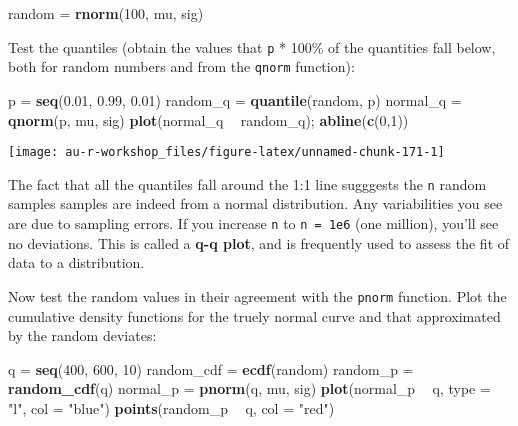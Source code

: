 \documentclass[]{book}
\newenvironment{Shaded}{\begin{snugshade}}{\end{snugshade}}
\newcommand{\KeywordTok}[1]{\textcolor[rgb]{0.13,0.29,0.53}{\textbf{#1}}}
\newcommand{\DataTypeTok}[1]{\textcolor[rgb]{0.13,0.29,0.53}{#1}}
\newcommand{\DecValTok}[1]{\textcolor[rgb]{0.00,0.00,0.81}{#1}}
\newcommand{\FloatTok}[1]{\textcolor[rgb]{0.00,0.00,0.81}{#1}}
\newcommand{\StringTok}[1]{\textcolor[rgb]{0.31,0.60,0.02}{#1}}
\newcommand{\OperatorTok}[1]{\textcolor[rgb]{0.81,0.36,0.00}{\textbf{#1}}}
\newcommand{\NormalTok}[1]{#1}
\theoremstyle{definition}
\theoremstyle{definition}
\theoremstyle{definition}
\theoremstyle{remark}
\begin{document}
\begin{Shaded}
\begin{Highlighting}[]
\NormalTok{random =}\StringTok{ }\KeywordTok{rnorm}\NormalTok{(}\DecValTok{100}\NormalTok{, mu, sig)}
\end{Highlighting}
\end{Shaded}

Test the quantiles (obtain the values that \texttt{p} * 100\% of the
quantities fall below, both for random numbers and from the
\texttt{qnorm} function):

\begin{Shaded}
\begin{Highlighting}[]
\NormalTok{p =}\StringTok{ }\KeywordTok{seq}\NormalTok{(}\FloatTok{0.01}\NormalTok{, }\FloatTok{0.99}\NormalTok{, }\FloatTok{0.01}\NormalTok{)}
\NormalTok{random_q =}\StringTok{ }\KeywordTok{quantile}\NormalTok{(random, p)}
\NormalTok{normal_q =}\StringTok{ }\KeywordTok{qnorm}\NormalTok{(p, mu, sig)}
\KeywordTok{plot}\NormalTok{(normal_q }\OperatorTok{~}\StringTok{ }\NormalTok{random_q); }\KeywordTok{abline}\NormalTok{(}\KeywordTok{c}\NormalTok{(}\DecValTok{0}\NormalTok{,}\DecValTok{1}\NormalTok{))}
\end{Highlighting}
\end{Shaded}

\begin{center}\texttt{[image: au-r-workshop\_files/figure-latex/unnamed-chunk-171-1]} \end{center}

The fact that all the quantiles fall around the 1:1 line sugggests the
\texttt{n} random samples samples are indeed from a normal distribution.
Any variabilities you see are due to sampling errors. If you increase
\texttt{n} to \texttt{n\ =\ 1e6} (one million), you'll see no
deviations. This is called a \textbf{q-q plot}, and is frequently used
to assess the fit of data to a distribution.

Now test the random values in their agreement with the \texttt{pnorm}
function. Plot the cumulative density functions for the truely normal
curve and that approximated by the random deviates:

\begin{Shaded}
\begin{Highlighting}[]
\NormalTok{q =}\StringTok{ }\KeywordTok{seq}\NormalTok{(}\DecValTok{400}\NormalTok{, }\DecValTok{600}\NormalTok{, }\DecValTok{10}\NormalTok{)}
\NormalTok{random_cdf =}\StringTok{ }\KeywordTok{ecdf}\NormalTok{(random)}
\NormalTok{random_p =}\StringTok{ }\KeywordTok{random_cdf}\NormalTok{(q)}
\NormalTok{normal_p =}\StringTok{ }\KeywordTok{pnorm}\NormalTok{(q, mu, sig)}
\KeywordTok{plot}\NormalTok{(normal_p }\OperatorTok{~}\StringTok{ }\NormalTok{q, }\DataTypeTok{type =} \StringTok{"l"}\NormalTok{, }\DataTypeTok{col =} \StringTok{"blue"}\NormalTok{)}
\KeywordTok{points}\NormalTok{(random_p }\OperatorTok{~}\StringTok{ }\NormalTok{q, }\DataTypeTok{col =} \StringTok{"red"}\NormalTok{)}
\end{Highlighting}
\end{Shaded}
\end{document}
